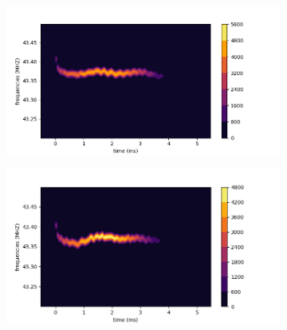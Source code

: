 \documentclass[11pt]{report}
\begin{document}
\begin{figure}[h!]
\centering
\begin{subfigure}{.48\textwidth}
  \centering
  \includegraphics[width=1.1\linewidth]{spec3-42}
\end{subfigure}%
\hspace{1em}%
\begin{subfigure}{.48\textwidth}
  \centering
  \includegraphics[width=1.1\linewidth]{spec3-43}
\end{subfigure}
\end{figure}
\end{document}
